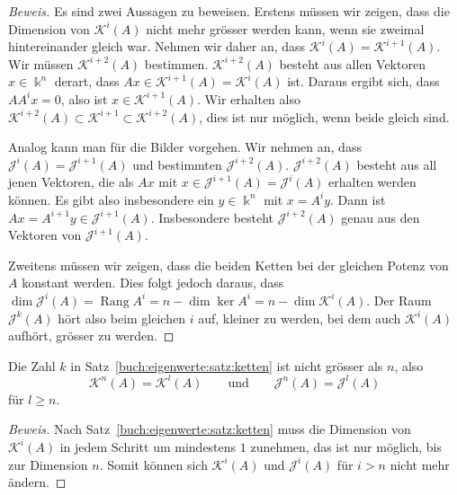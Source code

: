 \begin{proof}[Beweis]
Es sind zwei Aussagen zu beweisen.
Erstens müssen wir zeigen, dass die Dimension von $\mathcal{K}^i(A)$ 
nicht mehr grösser werden kann, wenn sie zweimal hintereinander gleich war.
Nehmen wir daher an, dass $\mathcal{K}^i(A) = \mathcal{K}^{i+1}(A)$.
Wir müssen $\mathcal{K}^{i+2}(A)$ bestimmen.
$\mathcal{K}^{i+2}(A)$ besteht aus allen Vektoren $x\in\Bbbk^n$ derart,
dass $Ax\in \mathcal{K}^{i+1}(A)=\mathcal{K}^i(A)$ ist.
Daraus ergibt sich, dass $AA^ix=0$, also ist $x\in\mathcal{K}^{i+1}(A)$.
Wir erhalten also
$\mathcal{K}^{i+2}(A)\subset\mathcal{K}^{i+1}\subset\mathcal{K}^{i+2}(A)$,
dies ist nur möglich, wenn beide gleich sind.

Analog kann man für die Bilder vorgehen.
Wir nehmen an, dass $\mathcal{J}^i(A) = \mathcal{J}^{i+1}(A)$ und
bestimmten $\mathcal{J}^{i+2}(A)$.
$\mathcal{J}^{i+2}(A)$ besteht aus all jenen Vektoren, die als
$Ax$ mit $x\in\mathcal{J}^{i+1}(A)=\mathcal{J}^i(A)$ erhalten
werden können.
Es gibt also insbesondere ein $y\in\Bbbk^n$ mit $x=A^iy$.
Dann ist $Ax=A^{i+1}y\in\mathcal{J}^{i+1}(A)$.
Insbesondere besteht $\mathcal{J}^{i+2}(A)$ genau aus den Vektoren
von $\mathcal{J}^{i+1}(A)$.

Zweitens müssen wir zeigen, dass die beiden Ketten bei der gleichen
Potenz von $A$ konstant werden.
Dies folgt jedoch daraus, dass $\dim\mathcal{J}^i(A) = \operatorname{Rang} A^i
= n - \dim\ker A^i = n -\dim\mathcal{K}^i(A)$.
Der Raum $\mathcal{J}^k(A)$ hört also beim gleichen $i$ auf, kleiner
zu werden, bei dem auch $\mathcal{K}^i(A)$ aufhört, grösser zu werden.
\end{proof}

\begin{satz}
Die Zahl $k$ in Satz~\ref{buch:eigenwerte:satz:ketten}
ist nicht grösser als $n$, also
\[
\mathcal{K}^n(A) = \mathcal{K}^l(A)
\qquad\text{und}\qquad
\mathcal{J}^n(A) = \mathcal{J}^l(A)
\]
für $l\ge n$.
\end{satz}

\begin{proof}[Beweis]
Nach Satz~\ref{buch:eigenwerte:satz:ketten} muss die
Dimension von $\mathcal{K}^i(A)$ in jedem Schritt um mindestens
$1$ zunehmen, das ist nur möglich, bis zur Dimension $n$.
Somit können sich $\mathcal{K}^i(A)$ und $\mathcal{J}^i(A)$ für $i>n$
nicht mehr ändern.
\end{proof}

